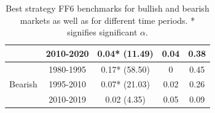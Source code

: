 \documentclass{article}
\begin{document}
\begin{table}[h]
\begin{minipage}{0.4\textwidth}
\begin{tabular}{lcccc}
                                     & 2010-2020 & 0.04* (11.49) & 0.04 & 0.38 \\
            \midrule
            \multirow{3}{*}{Bearish} & 1980-1995 & 0.17* (58.50) & 0 & 0.45 \\
                                     & 1995-2010 & 0.07* (21.03) & 0.02 & 0.26 \\
                                     & 2010-2019 & 0.02 (4.35) & 0.05 & 0.09 \\
            \bottomrule
        \end{tabular}
        \caption{Best strategy FF6 benchmarks for bullish and bearish markets as well as for different time periods. * signifies significant $\alpha$.}
        \label{tab:regimes}
    \end{minipage}
\end{table}
\end{document}
